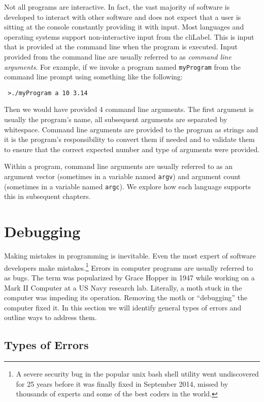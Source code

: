 Not all programs are interactive.  In fact, the vast majority of software is developed
to interact with other software and does not expect that a user is sitting at the console
constantly providing it with input.  Most languages and operating systems support 
non-interactive input from the \gls{cliLabel}.  This is input that is provided at the command
line when the program is executed.  Input provided from the command line are usually referred
to as \emph{command line arguments}.  For example, if we invoke a program named 
\texttt{myProgram} from the command line prompt using something like the following:

\texttt{~>./myProgram a 10 3.14}

Then we would have provided 4 command line arguments.  The first argument 
is usually the program's name, all subsequent arguments are separated by 
whitespace.  Command line arguments are provided to the program as strings 
and it is the program's responsibility to convert them if needed and to 
validate them to ensure that the correct expected number and type of arguments 
were provided.

Within a program, command line arguments are usually referred to as an argument vector
(sometimes in a variable named \texttt{argv}) and argument count (sometimes
in a variable named \texttt{argc}).  We explore how each language supports this
in subsequent chapters.

\section{Debugging}

Making mistakes in programming is inevitable.  Even the most expert of software 
developers make mistakes.\footnote{A severe security bug in the popular unix 
bash shell utility went undiscovered for 25 years before it was finally 
fixed in September 2014, missed by thousands of experts and some of the
best coders in the world.}  Errors in computer programs are usually 
referred to as \glspl{bug}.  The term was popularized by Grace Hopper in 
1947 while working on a Mark II Computer at a US Navy research lab.  
Literally, a moth stuck in the computer was impeding its operation.  Removing
the moth or ``debugging'' the computer fixed it.  In this section we will identify general
types of errors and outline ways to address them.

\subsection{Types of Errors}

